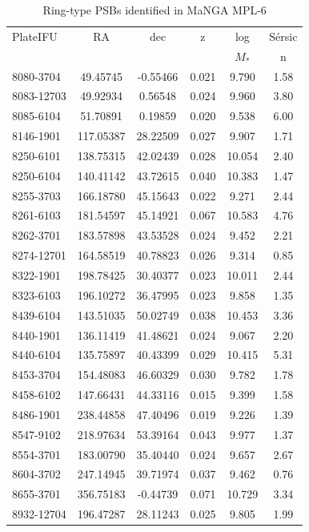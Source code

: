 \begin{table}[h]
\caption{Ring-type PSBs identified in MaNGA MPL-6}
\label{tab:my-RPSBs}
\begin{tabular}{lccccc}
\hline
PlateIFU & RA & dec & z & log & S\'ersic \\
& & & & $M_*$ & n \\
\hline
8080-3704 & 49.45745 & -0.55466 & 0.021 & 9.790 & 1.58 \\
8083-12703 & 49.92934 & 0.56548 & 0.024 & 9.960 & 3.80 \\
8085-6104 & 51.70891 & 0.19859 & 0.020 & 9.538 & 6.00 \\
8146-1901 & 117.05387 & 28.22509 & 0.027 & 9.907 & 1.71 \\
8250-6101 & 138.75315 & 42.02439 & 0.028 & 10.054 & 2.40 \\
8250-6104 & 140.41142 & 43.72615 & 0.040 & 10.383 & 1.47 \\
8255-3703 & 166.18780 & 45.15643 & 0.022 & 9.271 & 2.44 \\
8261-6103 & 181.54597 & 45.14921 & 0.067 & 10.583 & 4.76 \\
8262-3701 & 183.57898 & 43.53528 & 0.024 & 9.452 & 2.21 \\
8274-12701 & 164.58519 & 40.78823 & 0.026 & 9.314 & 0.85 \\
8322-1901 & 198.78425 & 30.40377 & 0.023 & 10.011 & 2.44 \\
8323-6103 & 196.10272 & 36.47995 & 0.023 & 9.858 & 1.35 \\
8439-6104 & 143.51035 & 50.02749 & 0.038 & 10.453 & 3.36 \\
8440-1901 & 136.11419 & 41.48621 & 0.024 & 9.067 & 2.20 \\
8440-6104 & 135.75897 & 40.43399 & 0.029 & 10.415 & 5.31 \\
8453-3704 & 154.48083 & 46.60329 & 0.030 & 9.782 & 1.78 \\
8458-6102 & 147.66431 & 44.33116 & 0.015 & 9.399 & 1.58 \\
8486-1901 & 238.44858 & 47.40496 & 0.019 & 9.226 & 1.39 \\
8547-9102 & 218.97634 & 53.39164 & 0.043 & 9.977 & 1.37 \\
8554-3701 & 183.00790 & 35.40440 & 0.024 & 9.657 & 2.67 \\
8604-3702 & 247.14945 & 39.71974 & 0.037 & 9.462 & 0.76 \\
8655-3701 & 356.75183 & -0.44739 & 0.071 & 10.729 & 3.34 \\
8932-12704 & 196.47287 & 28.11243 & 0.025 & 9.805 & 1.99 \\

\end{tabular}
\end{table}
